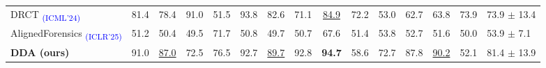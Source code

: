 \documentclass{article}
\begin{document}
\begin{table}[tb!]
\begin{adjustbox}{width=\linewidth}
\begin{tabular}{lcccccccccccccl}
DRCT \textsubscript{\textcolor{blue}{(ICML'24)}} \cite{chen2024drct} & 81.4 & 78.4 & 91.0 & 51.5 & 93.8 & 82.6 & 71.1 & \underline{84.9} & 72.2 & 53.0 & 62.7 & 63.8 & 73.9 & 73.9 $\pm$ 13.4 \\
AlignedForensics \textsubscript{\textcolor{blue}{(ICLR'25)}} \cite{rajan2025aligned} & 51.2 & 50.4 & 49.5 & 71.7 & 50.8 & 49.7 & 50.7 & 67.6 & 51.4 & 53.8 & 52.7 & 51.6 & 50.0 & 53.9 $\pm$ 7.1 \\
\midrule
\rowcolor{myblue}
\textbf{DDA (ours)} & 91.0 & \underline{87.0} & 72.5 & 76.5 & 92.7 & \underline{89.7} & 92.8 & \textbf{94.7} & 58.6 & 72.7 & 87.8 & \underline{90.2} & 52.1 & 81.4 $\pm$ 13.9 \\
\bottomrule
\end{tabular}
\end{adjustbox}
\vspace{0pt}
\end{table}
\end{document}
